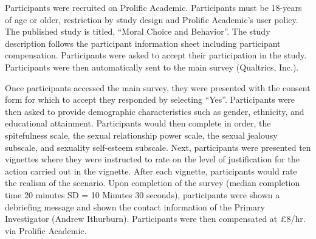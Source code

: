\documentclass[
  donotrepeattitle,doc, 12pt, a4paper,floatsintext]{apa7}
\begin{document}
Participants were recruited on Prolific Academic. Participants must be 18-years of age or older, restriction by study design and Prolific Academic's user policy. The published study is titled, ``Moral Choice and Behavior''. The study description follows the participant information sheet including participant compensation. Participants were asked to accept their participation in the study. Participants were then automatically sent to the main survey (Qualtrics, Inc.).

Once participants accessed the main survey, they were presented with the consent form for which to accept they responded by selecting ``Yes''. Participants were then asked to provide demographic characteristics such as gender, ethnicity, and educational attainment. Participants would then complete in order, the spitefulness scale, the sexual relationship power scale, the sexual jealousy subscale, and sexuality self-esteem subscale. Next, participants were presented ten vignettes where they were instructed to rate on the level of justification for the action carried out in the vignette. After each vignette, participants would rate the realism of the scenario. Upon completion of the survey (median completion time 20 minutes SD = 10 Minutes 30 seconds), participants were shown a debriefing message and shown the contact information of the Primary Investigator (Andrew Ithurburn). Participants were then compensated at £8/hr. via Prolific Academic.
\end{document}
